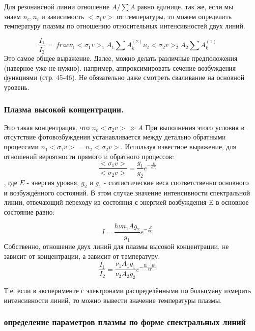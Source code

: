 \documentclass[10pt, a4paper]{article}
\numberwithin{equation}{section}
\begin{document}
Для резонансной линии отношение $A/\sum A $ равно единице. так же, если мы знаем $n_e, n_i$ и зависимость $<\sigma_1 v>$ от температуры, то можем определить температуру плазмы по отношению относительных интенсивностей двух линий.

\begin{equation}
	\frac{I_1}{I_2}= \ frac {\nu_1 <\sigma_1 v>_1 A_1 \sum A_k^{(2)} }{\nu_2 <\sigma_2 v>_2 A_2 \sum A_k^{(1)} }
\end{equation}
Это самое общее выражение. Далее, можно делать различные предположения (наверное уже не нужно). например, аппроксимировать сечение возбуждения функциями (стр. 45-46).
Не обязательно даже смотреть сваливание на основной уровень.

\subsubsection{Плазма высокой концентрации.}
\label{11.2.2}

Это такая концентрация, что $n_e <\sigma_2 v> \gg A$ 
При выполнения этого условия в отсутствие фотовозбуждения устанавливается между детально обратными процессами $n_1 <\sigma_1 v> = n_2 <\sigma_2 v>$.
Используя известное выражение, для отношений вероятности прямого и обратного процессов:
\begin{equation}
	\frac{<\sigma_1 v>}{<\sigma_2 v>} = \frac{g_1}{g_2} e^{-\frac{E}{kT_e}}
\end{equation}
, где $E$ -  энергия уровня, $g_2$ и $g_1$  - статистические веса соответственно основного и возбуждённого состояний.
В этом случае значение интенсивности спектральной линии, отвечающий переходу из состояния с энергией возбуждения E в основное состояние равно:

\begin{equation}
	I=\frac{h \nu n_1 A g_2}{g_1} e^{-\frac{E}{kT_e}}
\end{equation}
Собственно, отношение двух линий для плазмы высокой концентрации, не зависит от концентрации, а зависит от температуру.
\begin{equation}
	\frac{I_1}{I_2}=\frac{ \nu_1 A_1 g_1}{ \nu_2 A_2 g_2} e^{-\frac{E_1 - E_2}{kT}}
\end{equation}

Т.е. если в эксперименте с электронами распределёнными по больцману измерить интенсивности линий, то можно вывести значение температуры плазмы. 

\subsubsection{определение параметров плазмы по форме спектральных линий}
\label{11.2.3}
\end{document}
